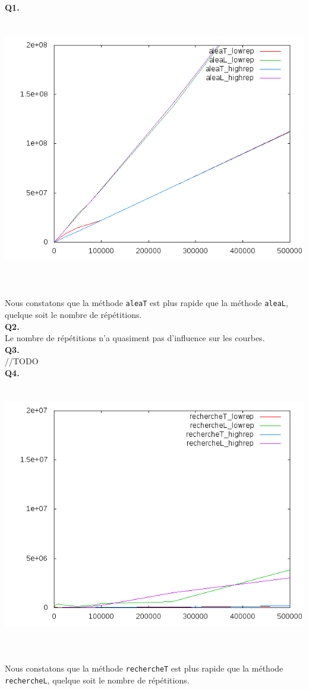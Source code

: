 \textbf{Q1.}
~\\
\includegraphics[height=12cm, width=\textwidth]{../lin_aleaTL.png}
~\\
Nous constatons que la méthode \verb+aleaT+ est plus rapide que la méthode \verb+aleaL+, quelque soit le nombre de répétitions.
~\\

\textbf{Q2.}
~\\
Le nombre de répétitions n'a quasiment pas d'influence sur les courbes.
~\\

\textbf{Q3.}
~\\
//TODO
~\\

\textbf{Q4.}
~\\
\includegraphics[height=12cm, width=\textwidth]{../lin_rechercheTL.png}
~\\
Nous constatons que la méthode \verb+rechercheT+ est plus rapide que la méthode \verb+rechercheL+, quelque soit le nombre de répétitions.
~\\

